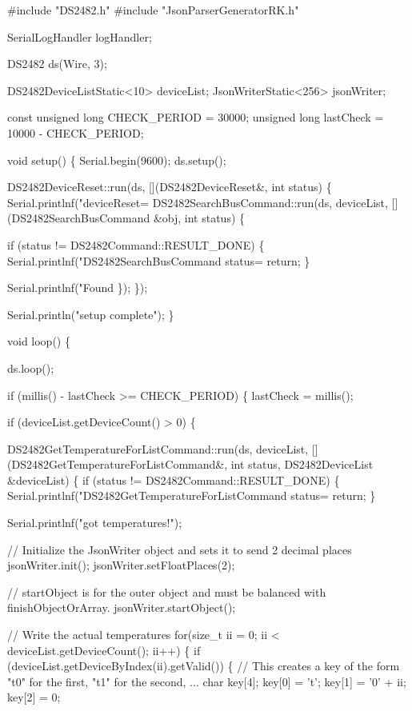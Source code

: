 \begin{DoxyCode}
#include "DS2482.h"
#include "JsonParserGeneratorRK.h"

SerialLogHandler logHandler;

DS2482 ds(Wire, 3);

DS2482DeviceListStatic<10> deviceList;
JsonWriterStatic<256> jsonWriter;

const unsigned long CHECK\_PERIOD = 30000;
unsigned long lastCheck = 10000 - CHECK\_PERIOD;

void setup() \{
    Serial.begin(9600);
    ds.setup();

    DS2482DeviceReset::run(ds, [](DS2482DeviceReset&, int status) \{
        Serial.printlnf("deviceReset=%
        DS2482SearchBusCommand::run(ds, deviceList, [](DS2482SearchBusCommand &obj, int status) \{

            if (status != DS2482Command::RESULT\_DONE) \{
                Serial.printlnf("DS2482SearchBusCommand status=%
                return;
            \}

            Serial.printlnf("Found %
        \});
    \});

    Serial.println("setup complete");
\}


void loop() \{

    ds.loop();

    if (millis() - lastCheck >= CHECK\_PERIOD) \{
        lastCheck = millis();

        if (deviceList.getDeviceCount() > 0) \{

            DS2482GetTemperatureForListCommand::run(ds, deviceList, [](DS2482GetTemperatureForListCommand&,
       int status, DS2482DeviceList &deviceList) \{
                if (status != DS2482Command::RESULT\_DONE) \{
                    Serial.printlnf("DS2482GetTemperatureForListCommand status=%
                    return;
                \}

                Serial.printlnf("got temperatures!");

                // Initialize the JsonWriter object and sets it to send 2 decimal places
                jsonWriter.init();
                jsonWriter.setFloatPlaces(2);

                // startObject is for the outer object and must be balanced with finishObjectOrArray.
                jsonWriter.startObject();

                // Write the actual temperatures
                for(size\_t ii = 0; ii < deviceList.getDeviceCount(); ii++) \{
                    if (deviceList.getDeviceByIndex(ii).getValid()) \{
                        // This creates a key of the form "t0" for the first, "t1" for the second, ...
                        char key[4];
                        key[0] = 't';
                        key[1] = '0' + ii;
                        key[2] = 0;


\end{DoxyCode}

